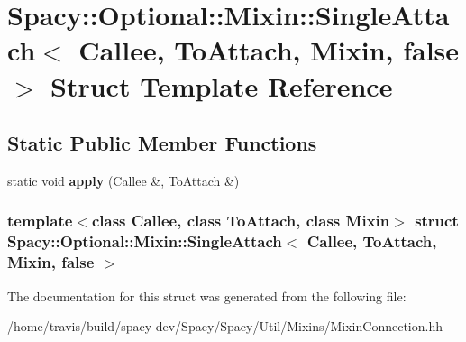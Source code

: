 \hypertarget{structSpacy_1_1Optional_1_1Mixin_1_1SingleAttach_3_01Callee_00_01ToAttach_00_01Mixin_00_01false_01_4}{\section{\-Spacy\-:\-:\-Optional\-:\-:\-Mixin\-:\-:\-Single\-Attach$<$ \-Callee, \-To\-Attach, \-Mixin, false $>$ \-Struct \-Template \-Reference}
\label{structSpacy_1_1Optional_1_1Mixin_1_1SingleAttach_3_01Callee_00_01ToAttach_00_01Mixin_00_01false_01_4}
}
\subsection*{\-Static \-Public \-Member \-Functions}
\begin{DoxyCompactItemize}
\item 
\hypertarget{structSpacy_1_1Optional_1_1Mixin_1_1SingleAttach_3_01Callee_00_01ToAttach_00_01Mixin_00_01false_01_4_a92ac7afd81a8e070f3b5da787b0c177e}{static void {\bfseries apply} (\-Callee \&, \-To\-Attach \&)}\label{structSpacy_1_1Optional_1_1Mixin_1_1SingleAttach_3_01Callee_00_01ToAttach_00_01Mixin_00_01false_01_4_a92ac7afd81a8e070f3b5da787b0c177e}

\end{DoxyCompactItemize}
\subsubsection*{template$<$class Callee, class To\-Attach, class Mixin$>$ struct Spacy\-::\-Optional\-::\-Mixin\-::\-Single\-Attach$<$ Callee, To\-Attach, Mixin, false $>$}



\-The documentation for this struct was generated from the following file\-:\begin{DoxyCompactItemize}
\item 
/home/travis/build/spacy-\/dev/\-Spacy/\-Spacy/\-Util/\-Mixins/\-Mixin\-Connection.\-hh\end{DoxyCompactItemize}
